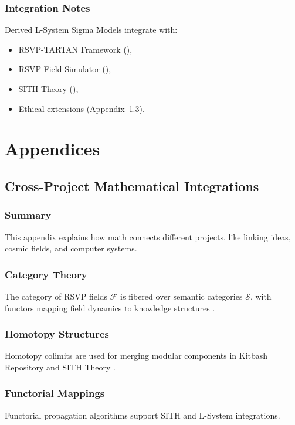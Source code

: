 \documentclass[11pt,oneside]{memoir}
\theoremstyle{plain}
\newcommand{\F}{\mathcal{F}}
\newcommand{\Sfun}{\mathcal{S}}
\begin{document}
\section{Integration Notes}
Derived L-System Sigma Models integrate with:
\begin{itemize}
    \item RSVP-TARTAN Framework (),
    \item RSVP Field Simulator (),
    \item SITH Theory (),
    \item Ethical extensions (Appendix~\ref{app:homotopy_structures}).
\end{itemize}

\part{Appendices}

\appendix
\chapter{Cross-Project Mathematical Integrations}
\label{app:category_theory}

\section{Summary}
This appendix explains how math connects different projects, like linking ideas, cosmic fields, and computer systems.

\section{Category Theory}
The category of RSVP fields \(\F\) is fibered over semantic categories \(\Sfun\), with functors mapping field dynamics to knowledge structures \cite{maclane}.

\section{Homotopy Structures}
\label{app:homotopy_structures}
Homotopy colimits are used for merging modular components in Kitbash Repository and SITH Theory \cite{lurie}.

\section{Functorial Mappings}
\label{app:functorial_mappings}
Functorial propagation algorithms support SITH and L-System integrations.
\end{document}
